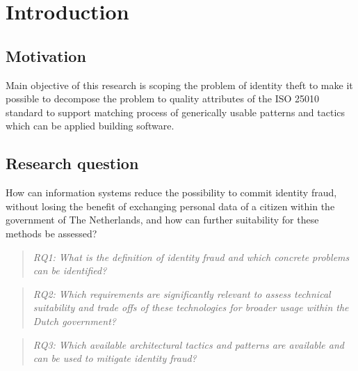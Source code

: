 \chapter{Introduction}\label{s:intro}


\section{Motivation}
Main objective of this research is scoping the problem of identity theft to make it possible to decompose the problem to quality attributes of the ISO 25010 standard \cite{ISO:25010:2011} to support matching process of generically usable patterns and tactics which can be applied building software.

\section{Research question}
How can information systems reduce the possibility to commit identity fraud, without losing the benefit of exchanging personal data of a citizen within the government of The Netherlands, and how can further suitability for these methods be assessed?

\begin{quote}\emph{RQ1: What is the definition of identity fraud and which concrete problems can be identified?}\end{quote}
\begin{quote}\emph{RQ2: Which requirements are significantly relevant to assess technical suitability and trade offs of these technologies for broader usage within the Dutch government?}\end{quote}
\begin{quote}\emph{RQ3: Which available architectural tactics and patterns are available and can be used to mitigate identity fraud?}\end{quote}

\break

